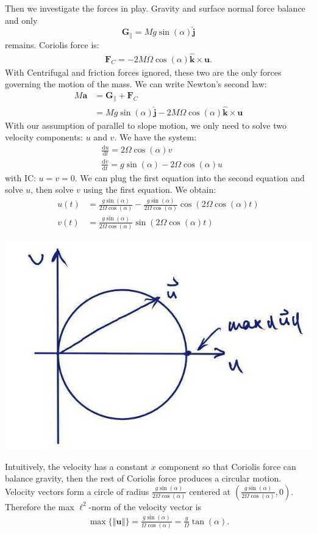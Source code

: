 \documentclass[11pt,letterpaper]{book}
\theoremstyle{definition}
\newcommand{\de}{\mathrm{d}}
\newcommand{\dsp}{\displaystyle}
\newcommand{\norm}[1]{\left\Vert #1 \right\Vert}
\newcommand{\ve}[1]{\boldsymbol{#1}}
\begin{document}
Then we investigate the forces in play. Gravity and surface normal force balance and only $$\ve G_\parallel = M g\sin(\alpha)\ve{\hat{j}}$$ remains. Coriolis force is:
\begin{align*}
\ve F_C = -2M\Omega\cos(\alpha)\ve{\hat{k}}\times \ve u.
\end{align*}
With Centrifugal and friction forces ignored, these two are the only forces governing the motion of the mass. We can write Newton's second law:
\begin{align*}
M\ve a &= \ve G_\parallel+\ve F_C\\
&= M g\sin(\alpha)\ve{\hat{j}}-2M\Omega\cos(\alpha)\ve{\hat{k}}\times \ve u
\end{align*}
With our assumption of parallel to slope motion, we only need to solve two velocity components: $u$ and $v$. We have the system:
\begin{align*}
&\frac{\de u}{\de t} = 2\Omega\cos(\alpha)v\\
&\frac{\de v}{\de t} = g\sin(\alpha)-2\Omega\cos(\alpha)u
\end{align*}
with IC: $u = v = 0$. We can plug the first equation into the second equation and solve $u$, then solve $v$ using the first equation. We obtain:
\begin{align*}
u(t) &= \frac{g\sin(\alpha)}{2\Omega\cos(\alpha)}-\frac{g\sin(\alpha)}{2\Omega\cos(\alpha)}\cos(2\Omega \cos(\alpha)t)\\
v(t) &= \frac{g\sin(\alpha)}{2\Omega\cos(\alpha)}\sin(2\Omega \cos(\alpha)t)
\end{align*}
\begin{center}
\includegraphics[scale=0.3]{Fig/max_norm}
\end{center}
Intuitively, the velocity has a constant $x$ component so that Coriolis force can balance gravity, then the rest of Coriolis force produces a circular motion. Velocity vectors form a circle of radius $\dsp{\frac{g\sin(\alpha)}{2\Omega\cos(\alpha)}}$ centered at $\dsp{\left( \frac{g\sin(\alpha)}{2\Omega\cos(\alpha)},0 \right)}$. Therefore the max $\ell^2$-norm of the velocity vector is
\begin{align*}
\max\{\norm{\ve u}\} = \frac{g\sin(\alpha)}{\Omega\cos(\alpha)} = \frac{g}{\Omega}\tan(\alpha).
\end{align*}
\end{document}
